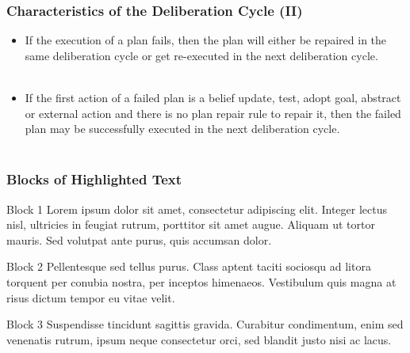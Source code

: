 \documentclass{beamer}
\begin{document}
\begin{frame}
\frametitle{Characteristics of the Deliberation Cycle (II)}
  \begin{itemize}
  
     \item If the execution of a plan fails, then the plan will either be repaired in the same
deliberation cycle or get re-executed in the next deliberation cycle. \\~\\

	\item If the first action of a failed plan is a belief update, test, adopt
goal, abstract or external action and there is no plan repair rule to
repair it, then the failed plan may be successfully executed in the next deliberation cycle. \\~\\

  \end{itemize}
\end{frame}


\begin{frame}
\frametitle{Blocks of Highlighted Text}
\begin{block}{Block 1}
Lorem ipsum dolor sit amet, consectetur adipiscing elit. Integer lectus nisl, ultricies in feugiat rutrum, porttitor sit amet augue. Aliquam ut tortor mauris. Sed volutpat ante purus, quis accumsan dolor.
\end{block}

\begin{block}{Block 2}
Pellentesque sed tellus purus. Class aptent taciti sociosqu ad litora torquent per conubia nostra, per inceptos himenaeos. Vestibulum quis magna at risus dictum tempor eu vitae velit.
\end{block}

\begin{block}{Block 3}
Suspendisse tincidunt sagittis gravida. Curabitur condimentum, enim sed venenatis rutrum, ipsum neque consectetur orci, sed blandit justo nisi ac lacus.
\end{block}
\end{frame}

\end{document}

